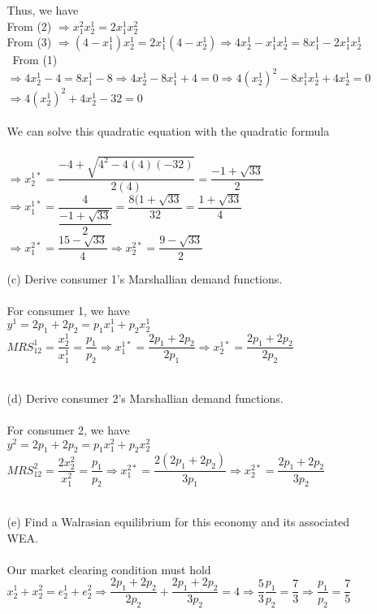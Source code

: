 \documentclass[11pt]{article}
\begin{document}
\begin{enumerate}
\begin{itemize}
	Thus, we have\\
	From (2) $\Rightarrow x_1^2x_2^1=2x_1^1x_2^2$\\
	From (3) $\Rightarrow (4-x_1^1)x_2^1=2x_1^1(4-x_2^1)\Rightarrow4x_2^1-x_1^1x_2^1=8x_1^1-2x_1^1x_2^1$\\\
	From (1) $\Rightarrow4x_2^1-4=8x_1^1-8\Rightarrow4x_2^1-8x_1^1+4=0\Rightarrow 4(x_2^1)^2-8x_1^1x_2^1+4x_2^1=0$\\
	$\Rightarrow4(x_2^1)^2+4x_2^1-32=0$\\\\
	We can solve this quadratic equation with the quadratic formula\\\\ $\Rightarrow x_2^{1*}=\dfrac{-4+\sqrt{4^2-4(4)(-32)}}{2(4)}=\dfrac{-1+\sqrt{33}}{2}$\\
	$\Rightarrow x_1^{1*}=\dfrac{4}{\dfrac{-1+\sqrt{33}}{2}}=\dfrac{8(1+\sqrt{33}}{32}=\dfrac{1+\sqrt{33}}{4}$\\
	$\Rightarrow x_1^{2*}=\dfrac{15-\sqrt{33}}{4}\Rightarrow x_2^{2*}=\dfrac{9-\sqrt{33}}{2}$\\
	\item[(c)] Derive consumer 1's Marshallian demand functions.
	\smallskip\\\\
	For consumer 1, we have\\
	$y^1=2p_1+2p_2=p_1x_1^1+p_2x_2^1$\\
	$MRS_{12}^1=\dfrac{x_2^1}{x_1^1}=\dfrac{p_1}{p_2}\Rightarrow x_1^{1*}=\dfrac{2p_1+2p_2}{2p_1}\Rightarrow x_2^{1*}=\dfrac{2p_1+2p_2}{2p_2}$\\\\
	\item[(d)] Derive consumer 2's Marshallian demand functions.
	\smallskip\\\\
	For consumer 2, we have\\
	$y^2=2p_1+2p_2=p_1x_1^2+p_2x_2^2$\\
	$MRS_{12}^2=\dfrac{2x_2^2}{x_1^2}=\dfrac{p_1}{p_2}\Rightarrow x_1^{2*}=\dfrac{2(2p_1+2p_2)}{3p_1}\Rightarrow x_2^{2*}=\dfrac{2p_1+2p_2}{3p_2}$\\\\
	\item[(e)] Find a Walrasian equilibrium for this economy and its associated WEA.
	\smallskip\\\\
	Our market clearing condition must hold\\
	$x_2^1+x_2^2=e_2^1+e_2^2\Rightarrow\dfrac{2p_1+2p_2}{2p_2}+\dfrac{2p_1+2p_2}{3p_2}=4\Rightarrow\dfrac{5}{3}\dfrac{p_1}{p_2}=\dfrac{7}{3}\Rightarrow\dfrac{p_1}{p_2}=\dfrac{7}{5}$\\

\end{itemize}
\end{enumerate}
\end{document}
